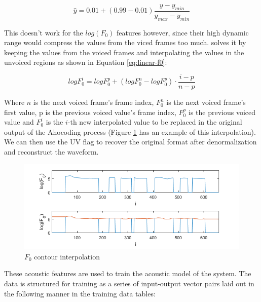 \begin{equation}
    \hat{y} = 0.01 + (0.99 - 0.01) \frac{y - y_{min}}{y_{max} - y_{min}}
    \label{eq:out-norm}
\end{equation}

This doesn't work for the $log(F_0)$ features however, since their high dynamic range would compress the values from the viced frames too much. \cite{pascual2016deep} solves it by keeping the values from the voiced frames and interpolating the values in the unvoiced regions as shown in Equation \ref{eq:linear-f0}:

\begin{equation}
    log F_0^i = log F_0^p + (log F_0^n - log F_0^p) \cdot \frac{i-p}{n-p}
    \label{eq:linear-f0}
\end{equation}

Where $n$ is the next voiced frame's frame index, $F_0^n$ is the next voiced frame's first value, p is the previous voiced value's frame index, $F_0^p$ is the previous voiced value and $F_0^i$ is the $i$-th new interpolated value to be replaced in the original output of the Ahocoding process (Figure \ref{fig:f0-int} has an example of this interpolation). We can then use the UV flag to recover the original format after denormalization and reconstruct the waveform.

\begin{figure}
    \centering
    \includegraphics[width=12cm]{figures/f0.png}
    \caption{$F_0$ contour interpolation}
    \label{fig:f0-int}
\end{figure}


These acoustic features are used to train the acoustic model of the system. The data is structured for training as a series of input-output vector pairs laid out in the following manner in the training data tables:

